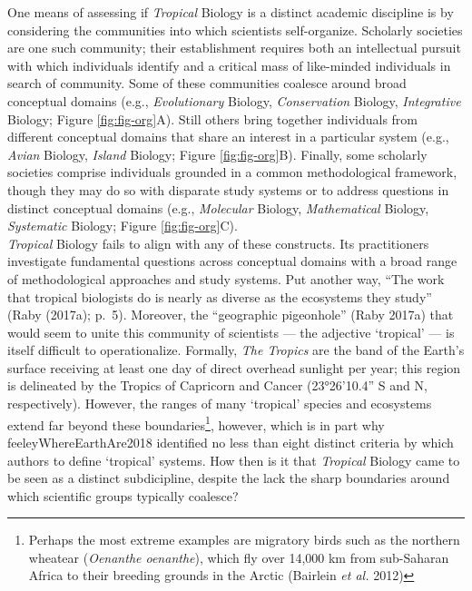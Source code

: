 \documentclass[
  12pt,
  man, donotrepeattitle,floatsintext]{apa6}
\begin{document}
\noindent One means of assessing if \emph{Tropical} Biology is a distinct academic discipline is by considering the communities into which scientists self-organize. Scholarly societies are one such community; their establishment requires both an intellectual pursuit with which individuals identify and a critical mass of like-minded individuals in search of community. Some of these communities coalesce around broad conceptual domains (e.g., \emph{Evolutionary} Biology, \emph{Conservation} Biology, \emph{Integrative} Biology; Figure \ref{fig:fig-org}A). Still others bring together individuals from different conceptual domains that share an interest in a particular system (e.g., \emph{Avian} Biology, \emph{Island} Biology; Figure \ref{fig:fig-org}B). Finally, some scholarly societies comprise individuals grounded in a common methodological framework, though they may do so with disparate study systems or to address questions in distinct conceptual domains (e.g., \emph{Molecular} Biology, \emph{Mathematical} Biology, \emph{Systematic} Biology; Figure \ref{fig:fig-org}C).\\
\emph{Tropical} Biology fails to align with any of these constructs. Its practitioners investigate fundamental questions across conceptual domains with a broad range of methodological approaches and study systems. Put another way, ``The work that tropical biologists do is nearly as diverse as the ecosystems they study'' (Raby (2017a); p.~5). Moreover, the ``geographic pigeonhole'' (Raby 2017a) that would seem to unite this community of scientists --- the adjective `tropical' --- is itself difficult to operationalize. Formally, \emph{The Tropics} are the band of the Earth's surface receiving at least one day of direct overhead sunlight per year; this region is delineated by the Tropics of Capricorn and Cancer (23°26'10.4'' S and N, respectively). However, the ranges of many `tropical' species and ecosystems extend far beyond these boundaries\footnote{Perhaps the most extreme examples are migratory birds such as the northern wheatear (\emph{Oenanthe oenanthe}), which fly over 14,000 km from sub-Saharan Africa to their breeding grounds in the Arctic (Bairlein \emph{et al.} 2012)}, however, which is in part why feeleyWhereEarthAre2018 identified no less than eight distinct criteria by which authors to define `tropical' systems. How then is it that \emph{Tropical} Biology came to be seen as a distinct subdicipline, despite the lack the sharp boundaries around which scientific groups typically coalesce?
\end{document}
